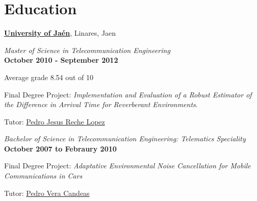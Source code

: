 \section{Education}
%
\href{http://www.ujaen.es/}{\textbf{University of Jaén}},
Linares, Jaen
\begin{outerlist}

\item[] \textit{Master of Science in Telecommunication Engineering}%
		\hfill \\ \textbf{October 2010 - September 2012}
		\begin{innerlist}
        \item Average grade 8.54 out of 10
        \item Final Degree Project: \emph{Implementation and Evaluation of a Robust Estimator of the Difference in Arrival Time for Reverberant Environments}.
        \item Tutor:
              \href{http://www4.ujaen.es/~pjreche}
                   {Pedro Jesus Reche Lopez}
	    \end{innerlist}

\item[]  \textit{Bachelor of Science in Telecommunication Engineering: Telematics Speciality}%
		\hfill \\ \textbf{October 2007 to Febraury 2010}
        \begin{innerlist}
        \item Final Degree Project: \emph{Adaptative Environmental Noise Cancellation for Mobile Communications in Cars}
        \item Tutor:
              \href{http://www4.ujaen.es/~pvera}
                   {Pedro Vera Candeas}
        \end{innerlist}

\end{outerlist}%

%
%

